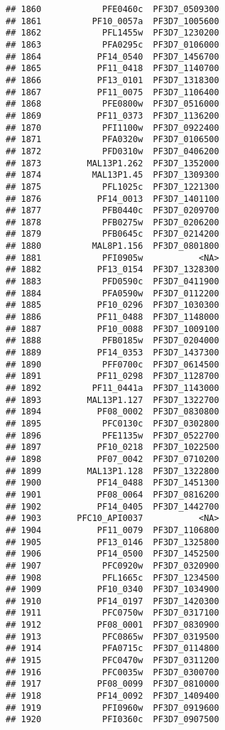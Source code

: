 \documentclass[12pt, a4paper]{article}\usepackage[]{graphicx}\usepackage[]{color}
\makeatletter
\newenvironment{kframe}{%
 \def\at@end@of@kframe{}%
 \ifinner\ifhmode%
  \def\at@end@of@kframe{\end{minipage}}%
  \begin{minipage}{\columnwidth}%
 \fi\fi%
 \def\FrameCommand##1{\hskip\@totalleftmargin \hskip-\fboxsep
 \colorbox{shadecolor}{##1}\hskip-\fboxsep
     \hskip-\linewidth \hskip-\@totalleftmargin \hskip\columnwidth}%
 \MakeFramed {\advance\hsize-\width
   \@totalleftmargin\z@ \linewidth\hsize
   \@setminipage}}%
 {\par\unskip\endMakeFramed%
 \at@end@of@kframe}
\newenvironment{knitrout}{}{} %
\makeatother
\begin{document}
\begin{knitrout}
\begin{kframe}
\begin{verbatim}
## 1860            PFE0460c  PF3D7_0509300
## 1861          PF10_0057a  PF3D7_1005600
## 1862            PFL1455w  PF3D7_1230200
## 1863            PFA0295c  PF3D7_0106000
## 1864           PF14_0540  PF3D7_1456700
## 1865           PF11_0418  PF3D7_1140700
## 1866           PF13_0101  PF3D7_1318300
## 1867           PF11_0075  PF3D7_1106400
## 1868            PFE0800w  PF3D7_0516000
## 1869           PF11_0373  PF3D7_1136200
## 1870            PFI1100w  PF3D7_0922400
## 1871            PFA0320w  PF3D7_0106500
## 1872            PFD0310w  PF3D7_0406200
## 1873         MAL13P1.262  PF3D7_1352000
## 1874          MAL13P1.45  PF3D7_1309300
## 1875            PFL1025c  PF3D7_1221300
## 1876           PF14_0013  PF3D7_1401100
## 1877            PFB0440c  PF3D7_0209700
## 1878            PFB0275w  PF3D7_0206200
## 1879            PFB0645c  PF3D7_0214200
## 1880          MAL8P1.156  PF3D7_0801800
## 1881            PFI0905w           <NA>
## 1882           PF13_0154  PF3D7_1328300
## 1883            PFD0590c  PF3D7_0411900
## 1884            PFA0590w  PF3D7_0112200
## 1885           PF10_0296  PF3D7_1030300
## 1886           PF11_0488  PF3D7_1148000
## 1887           PF10_0088  PF3D7_1009100
## 1888            PFB0185w  PF3D7_0204000
## 1889           PF14_0353  PF3D7_1437300
## 1890            PFF0700c  PF3D7_0614500
## 1891           PF11_0298  PF3D7_1128700
## 1892          PF11_0441a  PF3D7_1143000
## 1893         MAL13P1.127  PF3D7_1322700
## 1894           PF08_0002  PF3D7_0830800
## 1895            PFC0130c  PF3D7_0302800
## 1896            PFE1135w  PF3D7_0522700
## 1897           PF10_0218  PF3D7_1022500
## 1898           PF07_0042  PF3D7_0710200
## 1899         MAL13P1.128  PF3D7_1322800
## 1900           PF14_0488  PF3D7_1451300
## 1901           PF08_0064  PF3D7_0816200
## 1902           PF14_0405  PF3D7_1442700
## 1903       PFC10_API0037           <NA>
## 1904           PF11_0079  PF3D7_1106800
## 1905           PF13_0146  PF3D7_1325800
## 1906           PF14_0500  PF3D7_1452500
## 1907            PFC0920w  PF3D7_0320900
## 1908            PFL1665c  PF3D7_1234500
## 1909           PF10_0340  PF3D7_1034900
## 1910           PF14_0197  PF3D7_1420300
## 1911            PFC0750w  PF3D7_0317100
## 1912           PF08_0001  PF3D7_0830900
## 1913            PFC0865w  PF3D7_0319500
## 1914            PFA0715c  PF3D7_0114800
## 1915            PFC0470w  PF3D7_0311200
## 1916            PFC0035w  PF3D7_0300700
## 1917           PF08_0099  PF3D7_0810000
## 1918           PF14_0092  PF3D7_1409400
## 1919            PFI0960w  PF3D7_0919600
## 1920            PFI0360c  PF3D7_0907500

\end{verbatim}
\end{kframe}
\end{knitrout}
\end{document}
